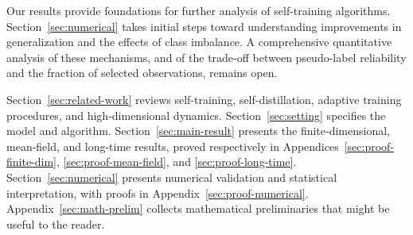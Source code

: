 Our results provide foundations for further analysis of
self-training algorithms.
Section~\ref{sec:numerical} takes initial steps toward
understanding improvements in generalization and the effects
of class imbalance.
A comprehensive quantitative analysis of these mechanisms,
and of the trade-off between pseudo-label reliability and
the fraction of selected observations, remains open.

Section~\ref{sec:related-work} reviews self-training,
self-distillation, adaptive training procedures, and
high-dimensional dynamics.
Section~\ref{sec:setting} specifies the model and algorithm.
Section~\ref{sec:main-result} presents the finite-dimensional,
mean-field, and long-time results, proved respectively in
Appendices~\ref{sec:proof-finite-dim},
\ref{sec:proof-mean-field}, and \ref{sec:proof-long-time}.
Section~\ref{sec:numerical} presents numerical validation and
statistical interpretation, with proofs in
Appendix~\ref{sec:proof-numerical}.
Appendix~\ref{sec:math-prelim} collects mathematical preliminaries 
that might be useful to the reader.
